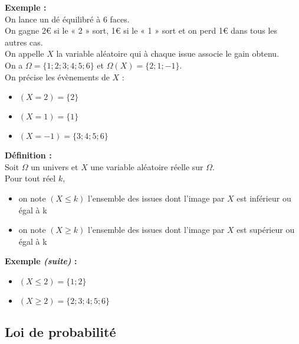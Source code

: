 \documentclass{article}
\begin{document}
\textbf{Exemple :} ~\\
On lance un dé équilibré à 6 faces. \\
On gagne 2€ si le « 2 » sort, 1€ si le « 1 » sort et on perd 1€ dans tous les autres cas. \\
On appelle $X$ la variable aléatoire qui à chaque issue associe le gain obtenu. \\

On a $\Omega=\{1;2;3;4;5;6\}$ et $\Omega(X)=\{2;1;-1\}$. \\
On précise les évènements de $X$ :
\vspace{-4pt}
\begin{itemize}
    \item $(X=2)=\{2\}$
    \item $(X=1)=\{1\}$
    \item $(X=-1)=\{3;4;5;6\}$
\end{itemize}

\begin{mdframed}[style=definitionStyle]
    \textbf{Définition :} ~\\
    Soit $\Omega$ un univers et $X$ une variable aléatoire réelle sur $\Omega$.\\
    Pour tout réel $k$,
    \vspace*{-4pt}
    \begin{itemize}
      \item on note $(X\leq k)$ l'ensemble des issues dont l'image par $X$ est inférieur ou égal à k
      \item on note $(X\geq k)$ l'ensemble des issues dont l'image par $X$ est supérieur ou égal à k
    \end{itemize}
\end{mdframed}

\textbf{Exemple \emph{(suite)} :}
\vspace{-4pt}
\begin{itemize}
  \item $(X\leq2) = \{ 1;2 \}$
  \item $(X\geq2) = \{ 2;3;4;5;6 \}$
\end{itemize}

\subsection{Loi de probabilité}
\end{document}
